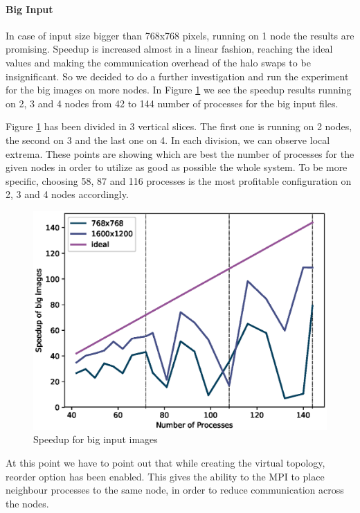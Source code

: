 \documentclass[12pt,a4paper]{article}
\begin{document}
          \paragraph{Big Input}
            In case of input size bigger than 768x768 pixels, running on 1 node the results are promising. Speedup is increased almost in a linear fashion, reaching the ideal values and making the communication overhead of the halo swaps to be insignificant. So we decided to do a further investigation and run the experiment for the big images on more nodes. In Figure \ref{speedupBigInput} we see the speedup results running on 2, 3 and 4 nodes from 42 to 144 number of processes for the big input files.
        
        	Figure \ref{speedupBigInput} has been divided in 3 vertical slices. The first one is running on 2 nodes, the second on 3 and the last one on 4. In each division, we can observe local extrema. These points are showing which are best the number of processes for the given nodes in order to utilize as good as possible the whole system. To be more specific, choosing 58, 87 and 116 processes is the most profitable configuration on 2, 3 and 4 nodes accordingly.
        	
        	\begin{figure}[ht]
        		\centering
        		\includegraphics[scale=0.8]{../graphs/speedupBigInput.eps}
        		\caption{Speedup for big input images}
        		\label{speedupBigInput}
        	\end{figure}

            At this point we have to point out that while creating the virtual topology, reorder option has been enabled. This gives the ability to the MPI to place neighbour processes to the same node, in order to reduce communication across the nodes.
          
\end{document}
